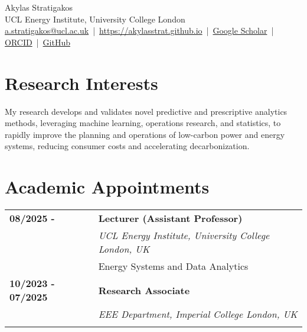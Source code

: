 \documentclass[11pt,a4paper]{article}
\makeatletter
\newlength{\datecolwidth}
\newenvironment{entrylist}{%
  \begin{longtable}{@{}p{\datecolwidth}@{\hspace{0.8em}}p{\dimexpr\linewidth-\datecolwidth-0.8em\relax}@{}}%
}{\end{longtable}}
\newcommand{\entry}[4]{%
  \textbf{#1} & \textbf{#2}\\[-0.2em]
              & {\itshape #3}\\[-0.2em]
              & #4\\[0.8em]
}
\newcommand{\name}{Akylas Stratigakos}
\newcommand{\affiliation}{UCL Energy Institute, University College London}
\newcommand{\emailaddr}{a.stratigakos@ucl.ac.uk}
\newcommand{\website}{https://akylasstrat.github.io}
\newcommand{\scholar}{https://scholar.google.com/citations?user=RBrai44AAAAJ&hl=en}   %
\newcommand{\orcid}{https://orcid.org/0000-0002-9954-5558}
\newcommand{\github}{https://github.com/akylasstrat}
\makeatother
\begin{document}
\begin{center}
  {\LARGE \name}\\[2pt]
  \affiliation\\[6pt]
  \href{mailto:\emailaddr}{\emailaddr} \,|\, \href{\website}{\website} \,|\,
  \href{\scholar}{Google Scholar} \,|\, \href{\orcid}{ORCID} \,|\, \href{\github}{GitHub}
\end{center}

\section*{Research Interests}

My research develops and validates novel predictive and prescriptive analytics methods,
 leveraging machine learning, operations research, and statistics, 
 to rapidly improve the planning and operations of low-carbon power and energy systems, 
 reducing consumer costs and accelerating decarbonization. 


\section*{Academic Appointments}
\begin{entrylist}
  \entry{08/2025 -}{Lecturer (Assistant Professor)}{UCL Energy Institute, University College London, UK}{
    Energy Systems and Data Analytics
  }
  \entry{10/2023 - 07/2025}{Research Associate}{EEE Department, Imperial College London, UK}{
  }
\end{entrylist}
\end{document}
